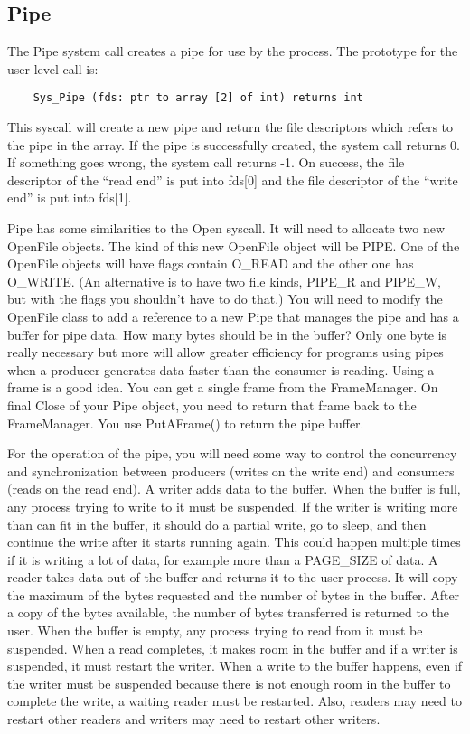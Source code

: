 \documentclass[11pt]{article}
\begin{document}
\subsection{Pipe}

The Pipe system call creates a pipe for use by the process. The
prototype for the user level call is:
\begin{verbatim}
    Sys_Pipe (fds: ptr to array [2] of int) returns int
\end{verbatim}

This syscall will create a new pipe and return the file descriptors
which refers to the pipe in the array.  If the pipe is successfully created,
the system call returns 0.  If something goes wrong, the system call
returns -1.  On success, the file descriptor of the ``read end'' is
put into fds[0] and the file descriptor of the ``write end'' is put
into fds[1].

Pipe has some similarities to the Open syscall.  It will need to
allocate two new OpenFile objects.  The kind of this new OpenFile
object will be PIPE.  One of the OpenFile objects will have flags
contain O\_READ and the other one has O\_WRITE. (An alternative is to
have two file kinds, PIPE\_R and PIPE\_W, but with the flags you
shouldn't have to do that.)  You will need to modify the OpenFile class
to add a reference to a new Pipe that manages the pipe and has a
buffer for pipe data.  How many bytes should be in the buffer?  Only
one byte is really necessary but more will allow greater efficiency
for programs using pipes when a producer generates data faster than
the consumer is reading.  Using a frame is a good idea.  You can get a
single frame from the FrameManager.  On final Close of your Pipe
object, you need to return that frame back to the FrameManager.  You
use PutAFrame() to return the pipe buffer.

For the operation of the pipe, you will need some way to control the
concurrency and synchronization between producers (writes on the write
end) and consumers (reads on the read end).  A writer adds data to the
buffer.  When the buffer is full, any process trying to write to it
must be suspended.  If the writer is writing more than can fit in
the buffer, it should do a partial write, go to sleep, and then
continue the write after it starts running again.  This could
happen multiple times if it is writing a lot of data, for example
more than a PAGE\_SIZE of data.  A reader
takes data out of the buffer and returns it to the user process.
It will copy the maximum of the bytes requested and the number
of bytes in the buffer.   After a copy of the bytes available,
the number of bytes transferred is returned to the user.
When the buffer is empty, any process trying to
read from it must be suspended.  When a read completes, it makes
room in the buffer and if a writer is suspended, it must restart
the writer.   When a write to the buffer happens, even if the
writer must be suspended because there is not enough room in the
buffer to complete the write, a waiting reader must be restarted.
Also, readers may need to restart other readers and writers may
need to restart other writers.
\end{document}
